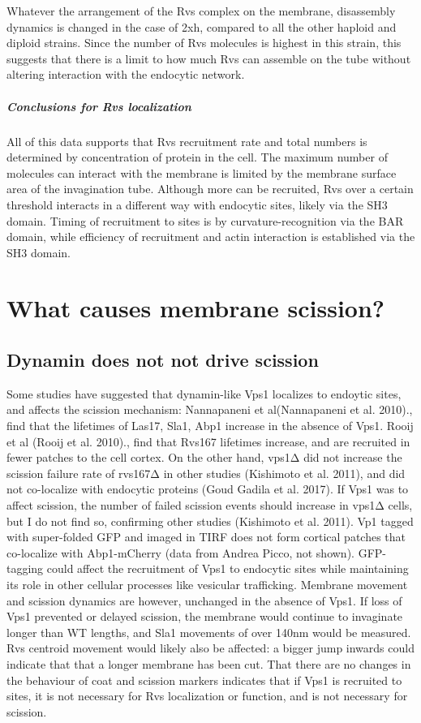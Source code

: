 	\vspace{5mm}
Whatever the arrangement of the Rvs complex on the membrane, disassembly dynamics is changed in the case of 2xh, compared to all the other haploid and diploid strains. Since the number of Rvs molecules is highest in this strain, this suggests that there is a limit to how much Rvs can assemble on the tube without altering interaction with the endocytic network. 


\subparagraph{Conclusions for Rvs localization }
All of this data supports that Rvs recruitment rate and total numbers is determined by concentration of protein in the cell. The maximum number of molecules can interact with the membrane is limited by the membrane surface area of the invagination tube. Although more can be recruited, Rvs over a certain threshold interacts in a different way with endocytic sites, likely via the SH3 domain. Timing of recruitment to sites is by curvature-recognition via the BAR domain, while efficiency of recruitment and actin interaction is established via the SH3 domain. 


\section{What causes membrane scission?}


\subsection{Dynamin does not not drive scission}
Some studies have suggested that dynamin-like Vps1 localizes to endoytic sites, and affects the scission mechanism: Nannapaneni et al(Nannapaneni et al. 2010)., find that the lifetimes of Las17, Sla1, Abp1 increase in the absence of Vps1. Rooij et al (Rooij et al. 2010)., find that Rvs167 lifetimes increase, and are recruited in fewer patches to the cell cortex. On the other hand, vps1Δ did not increase the scission failure rate of rvs167Δ in other studies (Kishimoto et al. 2011), and did not co-localize with endocytic proteins (Goud Gadila et al. 2017). If Vps1 was to affect scission, the number of failed scission events should increase in vps1Δ cells, but I do not find so, confirming other studies (Kishimoto et al. 2011). Vp1 tagged with super-folded GFP and imaged in TIRF does not form cortical patches that co-localize with Abp1-mCherry (data from Andrea Picco, not shown). GFP-tagging could affect the recruitment of Vps1 to endocytic sites while maintaining its role in other cellular processes like vesicular trafficking. Membrane movement and scission dynamics are however, unchanged in the absence of Vps1. If loss of Vps1 prevented or delayed scission, the membrane would continue to invaginate longer than WT lengths, and Sla1 movements of over 140nm would be measured. Rvs centroid movement would likely also be affected: a bigger jump inwards could indicate that that a longer membrane has been cut. That there are no changes in the behaviour of coat and scission markers indicates that if Vps1 is recruited to sites, it is not necessary for Rvs localization or function, and is not necessary for scission. 



